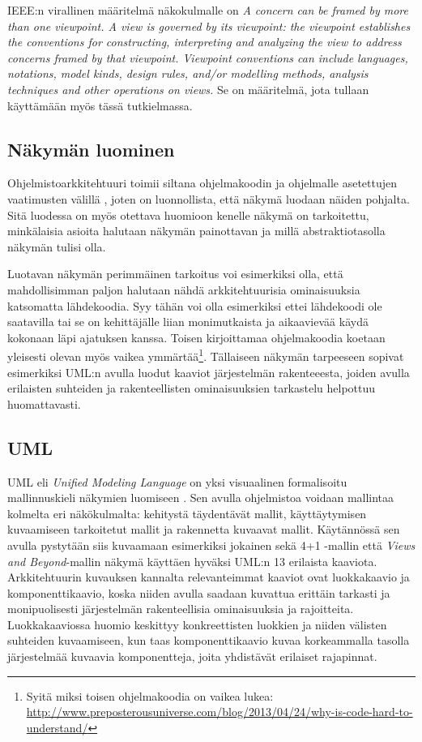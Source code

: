 \documentclass[finnish]{tktltiki2}
\numberwithin{table}{section}
\theoremstyle{definition}
\theoremstyle{remark}
\begin{document}
IEEE:n virallinen määritelmä näkokulmalle on \citep[s. 6]{ISOIEEE42010} \textit{A concern can be framed by more than one
viewpoint.
A view is governed by its viewpoint: the viewpoint establishes the conventions for constructing, interpreting
and analyzing the view to address concerns framed by that viewpoint. Viewpoint conventions can include
languages, notations, model kinds, design rules, and/or modelling methods, analysis techniques and other
operations on views. } Se on määritelmä, jota tullaan käyttämään myös tässä tutkielmassa.


\subsection{Näkymän luominen} %

Ohjelmistoarkkitehtuuri toimii siltana ohjelmakoodin ja ohjelmalle asetettujen vaatimusten välillä \citep[s. 94]{Garlan:2000:SAR:336512.336537}, joten on luonnollista, että näkymä luodaan näiden pohjalta. Sitä luodessa on myös otettava huomioon kenelle näkymä on tarkoitettu, minkälaisia asioita halutaan näkymän painottavan ja millä abstraktiotasolla näkymän tulisi olla. 


Luotavan näkymän perimmäinen tarkoitus voi esimerkiksi olla, että mahdollisimman paljon halutaan nähdä arkkitehtuurisia ominaisuuksia katsomatta lähdekoodia. Syy tähän voi olla esimerkiksi ettei lähdekoodi ole saatavilla tai se on kehittäjälle liian monimutkaista ja aikaavievää käydä kokonaan läpi ajatuksen kanssa. Toisen kirjoittamaa ohjelmakoodia koetaan yleisesti olevan myös vaikea ymmärtää\footnote{Syitä miksi toisen ohjelmakoodia on vaikea lukea: \url{http://www.preposterousuniverse.com/blog/2013/04/24/why-is-code-hard-to-understand/}}. Tällaiseen näkymän tarpeeseen sopivat esimerkiksi UML:n avulla luodut kaaviot järjestelmän rakenteeesta, joiden avulla erilaisten suhteiden ja rakenteellisten ominaisuuksien tarkastelu helpottuu huomattavasti.

\subsection{UML}

UML eli \textit{Unified Modeling Language} on yksi visuaalinen formalisoitu mallinnuskieli näkymien luomiseen \citep{UML}. Sen avulla ohjelmistoa voidaan mallintaa kolmelta eri näkökulmalta: kehitystä täydentävät mallit, käyttäytymisen kuvaamiseen tarkoitetut mallit ja rakennetta kuvaavat mallit. Käytännössä sen avulla pystytään siis kuvaamaan esimerkiksi jokainen sekä 4+1 -mallin että \textit{Views and Beyond}-mallin näkymä käyttäen hyväksi UML:n 13 erilaista kaaviota. Arkkitehtuurin kuvauksen kannalta relevanteimmat kaaviot ovat luokkakaavio ja komponenttikaavio, koska niiden avulla saadaan kuvattua erittäin tarkasti ja monipuolisesti järjestelmän rakenteellisia ominaisuuksia ja rajoitteita. Luokkakaaviossa huomio keskittyy konkreettisten luokkien ja niiden välisten suhteiden kuvaamiseen, kun taas komponenttikaavio kuvaa korkeammalla tasolla järjestelmää kuvaavia komponentteja, joita yhdistävät erilaiset rajapinnat.   
\end{document}
